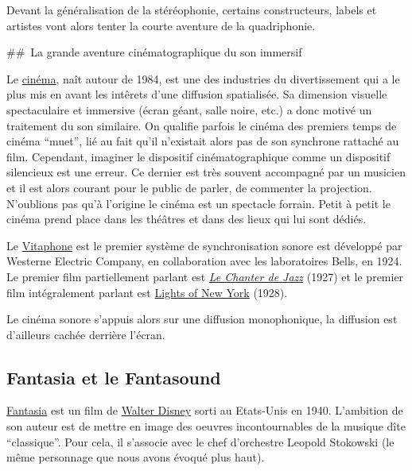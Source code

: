 \documentclass[
  letterpaper,
  DIV=11,
  numbers=noendperiod]{scrreprt}
\begin{document}
Devant la généralisation de la stéréophonie, certains constructeurs,
labels et artistes vont alors tenter la courte aventure de la
quadriphonie.

\#\#~La grande aventure cinématographique du son immersif

Le \href{https://fr.wikipedia.org/wiki/Cin\%C3\%A9ma}{cinéma}, naît
autour de 1984, est une des industries du divertissement qui a le plus
mis en avant les intêrets d'une diffusion spatialisée. Sa dimension
visuelle spectaculaire et immersive (écran géant, salle noire, etc.) a
donc motivé un traitement du son similaire. On qualifie parfois le
cinéma des premiers temps de cinéma ``muet'', lié au fait qu'il
n'existait alors pas de son synchrone rattaché au film. Cependant,
imaginer le dispositif cinématographique comme un dispositif silencieux
est une erreur. Ce dernier est très souvent accompagné par un musicien
et il est alors courant pour le public de parler, de commenter la
projection. N'oublions pas qu'à l'origine le cinéma est un spectacle
forrain. Petit à petit le cinéma prend place dans les théâtres et dans
des lieux qui lui sont dédiés.

Le \href{https://fr.wikipedia.org/wiki/Vitaphone}{Vitaphone} est le
premier système de synchronisation sonore est développé par Westerne
Electric Company, en collaboration avec les laboratoires Bells, en 1924.
Le premier film partiellement parlant est
\emph{\href{https://fr.wikipedia.org/wiki/Le_Chanteur_de_jazz}{Le
Chanter de Jazz}} (1927) et le premier film intégralement parlant est
\href{https://en.wikipedia.org/wiki/Lights_of_New_York_(1928_film)}{Lights
of New York} (1928).

Le cinéma sonore s'appuis alors sur une diffusion monophonique, la
diffusion est d'ailleurs cachée derrière l'écran.

\hypertarget{fantasia-et-le-fantasound}{%
\subsection{Fantasia et le Fantasound}\label{fantasia-et-le-fantasound}}

\href{https://fr.wikipedia.org/wiki/Fantasia_(film,_1940)}{Fantasia} est
un film de
\href{https://fr.wikipedia.org/wiki/Walt_Disney_Pictures}{Walter Disney}
sorti au Etats-Unis en 1940. L'ambition de son auteur est de mettre en
image des oeuvres incontournables de la musique dîte ``classique''. Pour
cela, il s'associe avec le chef d'orchestre Leopold Stokowski (le même
personnage que nous avons évoqué plus haut).
\end{document}
